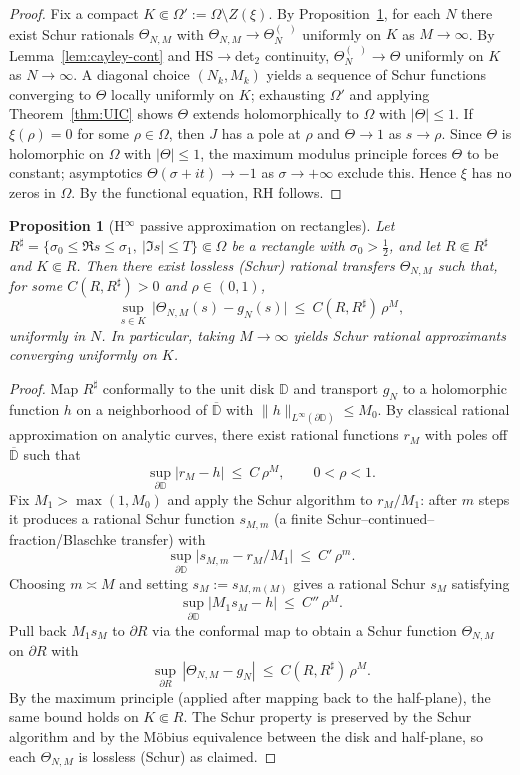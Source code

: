 \documentclass[11pt]{article}
\newtheorem{proposition}[theorem]{Proposition}
\theoremstyle{definition}
\theoremstyle{remark}
\DeclareMathOperator{\dettwo}{det_2}
\begin{document}
\begin{proof}
Fix a compact \(K\Subset\Omega':=\Omega\setminus Z(\xi)\). By Proposition~\ref{prop:hinf-passive}, for each \(N\) there exist Schur rationals \(\Theta_{N,M}\) with \(\Theta_{N,M}\to\Theta_N^{(\dettwo)}\) uniformly on \(K\) as \(M\to\infty\). By Lemma~\ref{lem:cayley-cont} and HS\(\to\)det$_2$ continuity, \(\Theta_N^{(\dettwo)}\to\Theta\) uniformly on \(K\) as \(N\to\infty\). A diagonal choice \((N_k,M_k)\) yields a sequence of Schur functions converging to \(\Theta\) locally uniformly on \(K\); exhausting \(\Omega'\) and applying Theorem~\ref{thm:UIC} shows \(\Theta\) extends holomorphically to \(\Omega\) with \(|\Theta|\le 1\).
If \(\xi(\rho)=0\) for some \(\rho\in\Omega\), then \(J\) has a pole at \(\rho\) and \(\Theta\to 1\) as \(s\to\rho\). Since \(\Theta\) is holomorphic on \(\Omega\) with \(|\Theta|\le 1\), the maximum modulus principle forces \(\Theta\) to be constant; asymptotics \(\Theta(\sigma+it)\to -1\) as \(\sigma\to+\infty\) exclude this. Hence \(\xi\) has no zeros in \(\Omega\). By the functional equation, RH follows.
\end{proof}
\begin{proposition}[H$^\infty$ passive approximation on rectangles]\label{prop:hinf-passive}
Let \(R^\sharp=\{\sigma_0\le \Re s\le \sigma_1,\ |\Im s|\le T\}\Subset\Omega\) be a rectangle with \(\sigma_0>\tfrac12\), and let \(R\Subset R^\sharp\) and \(K\Subset R\). Then there exist lossless (Schur) rational transfers \(\Theta_{N,M}\) such that, for some \(C(R,R^\sharp)>0\) and \(\rho\in(0,1)\),
\[
  \sup_{s\in K}\,\big|\Theta_{N,M}(s)-g_N(s)\big|\ \le\ C(R,R^\sharp)\,\rho^{M},
\]
uniformly in \(N\). In particular, taking \(M\to\infty\) yields Schur rational approximants converging uniformly on \(K\).
\end{proposition}
\begin{proof}
Map \(R^\sharp\) conformally to the unit disk \(\mathbb D\) and transport \(g_N\) to a holomorphic function \(h\) on a neighborhood of \(\overline{\mathbb D}\) with \(\|h\|_{L^\infty(\partial\mathbb D)}\le M_0\). By classical rational approximation on analytic curves, there exist rational functions \(r_M\) with poles off \(\overline{\mathbb D}\) such that
\[
 \sup_{\partial\mathbb D}|r_M-h|\ \le\ C\,\rho^M,\qquad 0<\rho<1.
\]
Fix \(M_1>\max(1,M_0)\) and apply the Schur algorithm to \(r_M/M_1\): after \(m\) steps it produces a rational Schur function \(s_{M,m}\) (a finite Schur–continued–fraction/Blaschke transfer) with
\[
 \sup_{\partial\mathbb D}\big|s_{M,m}-r_M/M_1\big|\ \le\ C'\,\rho^m.
\]
Choosing \(m\asymp M\) and setting \(s_M:=s_{M,m(M)}\) gives a rational Schur \(s_M\) satisfying
\[
 \sup_{\partial\mathbb D}\big|M_1 s_M-h\big|\ \le\ C''\,\rho^M.
\]
Pull back \(M_1 s_M\) to \(\partial R\) via the conformal map to obtain a Schur function \(\Theta_{N,M}\) on \(\partial R\) with
\[
 \sup_{\partial R}\,|\Theta_{N,M}-g_N|\ \le\ C(R,R^\sharp)\,\rho^M.
\]
By the maximum principle (applied after mapping back to the half-plane), the same bound holds on \(K\Subset R\). The Schur property is preserved by the Schur algorithm and by the Möbius equivalence between the disk and half-plane, so each \(\Theta_{N,M}\) is lossless (Schur) as claimed.
\end{proof}
\end{document}
